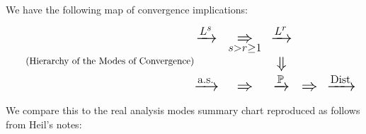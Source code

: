 \documentclass[12pt,reqno]{article}
\theoremstyle{plain}
\theoremstyle{definition}
\begin{document}
We have the following map of convergence implications:
\begin{equation} 
\tag{Hierarchy of the Modes of Convergence} 
\mbox{\LARGE
$\begin{matrix}
  \xrightarrow{\overset{}{L^s}}  & \underset{s>r\geq1}{\Rightarrow} &  \xrightarrow{\overset{}{L^r}}  &             & \\
                                 &                                  &     \Downarrow                  &             & \\
  \xrightarrow{\text{a.s.}}      &            \Rightarrow           &  \xrightarrow{\mathbb{P}}                & 
  \Rightarrow & \xrightarrow{\operatorname{Dist}}
  \end{matrix}$
}
\end{equation} 
We compare this to the real analysis modes summary chart reproduced as follows from Heil's notes: 
\begin{center} 
\end{center} 
\end{document}
